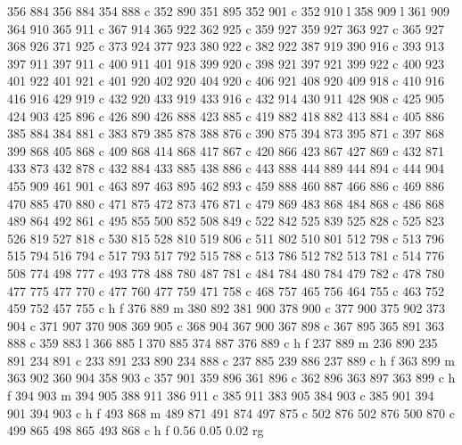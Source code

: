 {{        356 884 356 884 354 888 c
        352 890 351 895 352 901 c
        352 910 l
        358 909 l
        361 909 364 910 365 911 c
        367 914 365 922 362 925 c
        359 927 359 927 363 927 c
        365 927 368 926 371 925 c
        373 924 377 923 380 922 c
        382 922 387 919 390 916 c
        393 913 397 911 397 911 c
        400 911 401 918 399 920 c
        398 921 397 921 399 922 c
        400 923 401 922 401 921 c
        401 920 402 920 404 920 c
        406 921 408 920 409 918 c
        410 916 416 916 429 919 c
        432 920 433 919 433 916 c
        432 914 430 911 428 908 c
        425 905 424 903 425 896 c
        426 890 426 888 423 885 c
        419 882 418 882 413 884 c
        405 886 385 884 384 881 c
        383 879 385 878 388 876 c
        390 875 394 873 395 871 c
        397 868 399 868 405 868 c
        409 868 414 868 417 867 c
        420 866 423 867 427 869 c
        432 871 433 873 432 878 c
        432 884 433 885 438 886 c
        443 888 444 889 444 894 c
        444 904 455 909 461 901 c
        463 897 463 895 462 893 c
        459 888 460 887 466 886 c
        469 886 470 885 470 880 c
        471 875 472 873 476 871 c
        479 869 483 868 484 868 c
        486 868 489 864 492 861 c
        495 855 500 852 508 849 c
        522 842 525 839 525 828 c
        525 823 526 819 527 818 c
        530 815 528 810 519 806 c
        511 802 510 801 512 798 c
        513 796 515 794 516 794 c
        517 793 517 792 515 788 c
        513 786 512 782 513 781 c
        514 776 508 774 498 777 c
        493 778 488 780 487 781 c
        484 784 480 784 479 782 c
        478 780 477 775 477 770 c
        477 760 477 759 471 758 c
        468 757 465 756 464 755 c
        463 752 459 752 457 755 c
        h f
        376 889 m
        380 892 381 900 378 900 c
        377 900 375 902 373 904 c
        371 907 370 908 369 905 c
        368 904 367 900 367 898 c
        367 895 365 891 363 888 c
        359 883 l
        366 885 l
        370 885 374 887 376 889 c
        h f
        237 889 m
        236 890 235 891 234 891 c
        233 891 233 890 234 888 c
        237 885 239 886 237 889 c
        h f
        363 899 m
        363 902 360 904 358 903 c
        357 901 359 896 361 896 c
        362 896 363 897 363 899 c
        h f
        394 903 m
        394 905 388 911 386 911 c
        385 911 383 905 384 903 c
        385 901 394 901 394 903 c
        h f
        493 868 m
        489 871 491 874 497 875 c
        502 876 502 876 500 870 c
        499 865 498 865 493 868 c
        h f
        0.56 0.05 0.02 rg
}}
